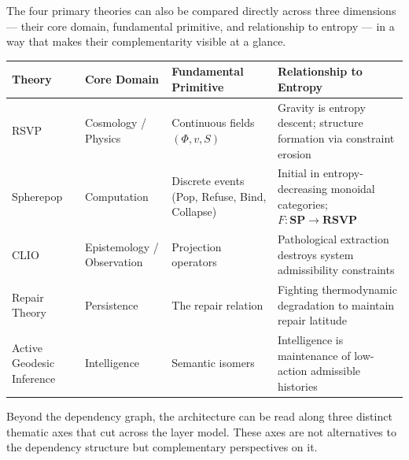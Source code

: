\documentclass[12pt, twoside]{article}
\begin{document}
\bigskip

The four primary theories can also be compared directly across three dimensions —
their core domain, fundamental primitive, and relationship to entropy — in a
way that makes their complementarity visible at a glance.

\bigskip
\begin{center}
\small
\begin{tabular}{p{2.8cm}p{2.8cm}p{2.8cm}p{4.5cm}}
\toprule
\textbf{Theory} & \textbf{Core Domain} & \textbf{Fundamental Primitive} & \textbf{Relationship to Entropy} \\
\midrule
RSVP & Cosmology / Physics & Continuous fields $(\Phi, v, S)$ & Gravity is entropy descent; structure formation via constraint erosion \\
\addlinespace
Spherepop & Computation & Discrete events (Pop, Refuse, Bind, Collapse) & Initial in entropy-decreasing monoidal categories; $F: \mathbf{SP}\to\mathbf{RSVP}$ \\
\addlinespace
CLIO & Epistemology / Observation & Projection operators & Pathological extraction destroys system admissibility constraints \\
\addlinespace
Repair Theory & Persistence & The repair relation & Fighting thermodynamic degradation to maintain repair latitude \\
\addlinespace
Active Geodesic Inference & Intelligence & Semantic isomers & Intelligence is maintenance of low-action admissible histories \\
\bottomrule
\end{tabular}
\end{center}
\bigskip

Beyond the dependency graph, the architecture can be read along three distinct
thematic axes that cut across the layer model. These axes are not alternatives
to the dependency structure but complementary perspectives on it.
\end{document}
